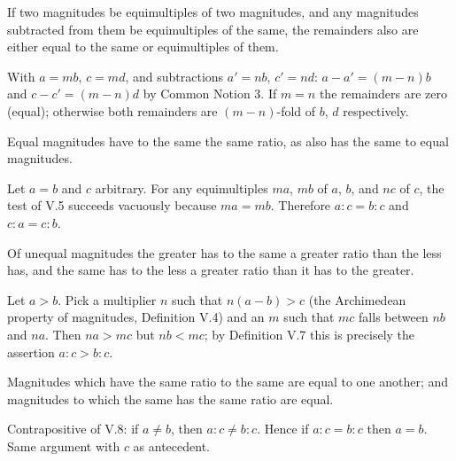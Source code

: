 \documentclass{rrxiv}
\begin{document}
\begin{claim}
\label{prop:V.6}
If two magnitudes be equimultiples of two magnitudes, and any
magnitudes subtracted from them be equimultiples of the same, the
remainders also are either equal to the same or equimultiples of them.
\end{claim}
\begin{evidence}[Proof of V.6]
\label{ev:V.6}
With $a = mb$, $c = md$, and subtractions $a' = nb$, $c' = nd$:
$a - a' = (m-n)b$ and $c - c' = (m-n)d$ by Common Notion 3.  If $m = n$
the remainders are zero (equal); otherwise both remainders are
$(m-n)$-fold of $b$, $d$ respectively.
\end{evidence}

\begin{claim}
\label{prop:V.7}
Equal magnitudes have to the same the same ratio, as also has the
same to equal magnitudes.
\end{claim}
\begin{evidence}[Proof of V.7]
\label{ev:V.7}
Let $a = b$ and $c$ arbitrary.  For any equimultiples $ma$, $mb$ of
$a$, $b$, and $nc$ of $c$, the test of V.5 succeeds vacuously because
$ma = mb$.  Therefore $a:c = b:c$ and $c:a = c:b$.
\end{evidence}

\begin{claim}
\label{prop:V.8}
Of unequal magnitudes the greater has to the same a greater ratio
than the less has, and the same has to the less a greater ratio than
it has to the greater.
\end{claim}
\begin{evidence}[Proof of V.8]
\label{ev:V.8}
Let $a > b$.  Pick a multiplier $n$ such that $n(a-b) > c$ (the
Archimedean property of magnitudes, Definition V.4) and an $m$ such
that $mc$ falls between $nb$ and $na$.  Then $na > mc$ but $nb < mc$;
by Definition V.7 this is precisely the assertion $a:c > b:c$.
\end{evidence}

\begin{claim}
\label{prop:V.9}
Magnitudes which have the same ratio to the same are equal to one
another; and magnitudes to which the same has the same ratio are
equal.
\end{claim}
\begin{evidence}[Proof of V.9]
\label{ev:V.9}
Contrapositive of V.8: if $a \neq b$, then $a:c \neq b:c$.  Hence if
$a:c = b:c$ then $a = b$.  Same argument with $c$ as antecedent.
\end{evidence}
\end{document}
